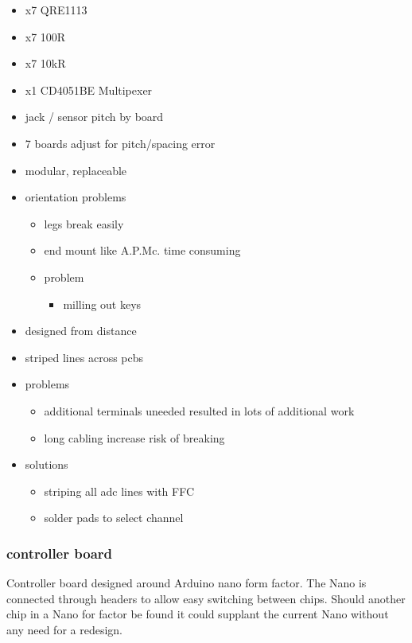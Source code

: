 \begin{itemize}
\item
  x7 QRE1113
\item
  x7 100R
\item
  x7 10kR
\item
  x1 CD4051BE Multipexer
\item
  jack / sensor pitch by board
\item
  7 boards adjust for pitch/spacing error
\item
  modular, replaceable
\item
  orientation problems

  \begin{itemize}
  \item
    legs break easily
  \item
    end mount like A.P.Mc. time consuming
  \item
    problem

    \begin{itemize}
    \item
      milling out keys
    \end{itemize}
  \end{itemize}
\item
  designed from distance
\item
  striped lines across pcbs
\item
  problems

  \begin{itemize}
  \item
    additional terminals uneeded resulted in lots of additional work
  \item
    long cabling increase risk of breaking
  \end{itemize}
\item
  solutions

  \begin{itemize}
  \item
    striping all adc lines with FFC
  \item
    solder pads to select channel
  \end{itemize}
\end{itemize}

\subsubsection{controller board}\label{controller-board}

Controller board designed around Arduino nano form factor. The Nano is
connected through headers to allow easy switching between chips. Should
another chip in a Nano for factor be found it could supplant the current
Nano without any need for a redesign.

